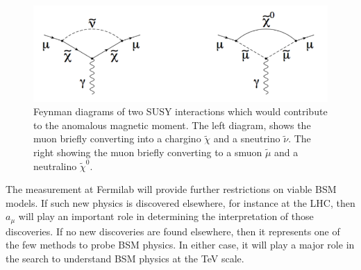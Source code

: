 \begin{figure}[th]
\centering
\includegraphics[scale=0.7]{Figures/SUSY}
\decoRule
\caption{Feynman diagrams of two SUSY interactions which would contribute to the anomalous magnetic moment. The left diagram, shows the muon briefly converting into a chargino $\tilde{\chi}$ and a sneutrino $\tilde{\nu}$. The right showing the muon briefly converting to a smuon $\tilde{\mu}$ and a neutralino $\tilde{\chi}^0$.}
\label{fig:SUSY}
\end{figure}

The measurement at Fermilab will provide further restrictions on viable BSM models. If such new physics is discovered elsewhere, for instance at the LHC, then $a_{\mu}$ will play an important role in determining the interpretation of those discoveries. If no new discoveries are found elsewhere, then it represents one of the few methods to probe BSM physics. In either case, it will play a major role in the search to understand BSM physics at the TeV scale.





